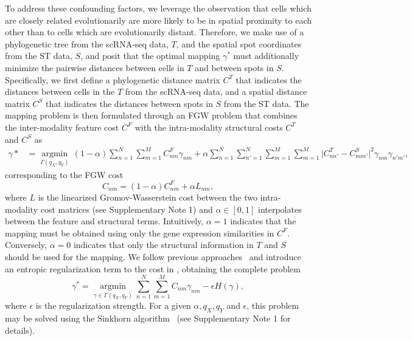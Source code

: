 \documentclass{article}
\begin{document}
To address these confounding factors, we leverage the observation that cells which are closely related evolutionarily are more likely to be in spatial proximity to each other than to cells which are evolutionarily distant. Therefore, we make use of a phylogenetic tree from the scRNA-seq data, $T$, and the spatial spot coordinates from the ST data, $S$, and posit that the optimal mapping $\gamma^*$ must additionally minimize the pairwise distances between cells in $T$ and between spots in $S$. Specifically, we first define a phylogenetic distance matrix $C^T$ that indicates the distances between cells in the $T$ from the scRNA-seq data, and a spatial distance matrix $C^S$ that indicates the distances between spots in $S$ from the ST data. The mapping problem is then formulated through an FGW problem that combines the inter-modality feature cost $C^F$ with the intra-modality structural costs $C^T$ and $C^S$ as
\begin{align}
\label{eq:fgw_ot}
    \gamma* &= \operatorname*{argmin}_{{ \Gamma(q_X, q_Y)}}\, (1-\alpha) 
    \sum_{n=1}^N \sum_{m=1}^M C^F_{nm}\gamma_{nm} 
    + \alpha \sum_{n=1}^N \sum_{n'=1}^N \sum_{m=1}^M \sum_{m=1}^M 
      \vert C^T_{nn'} - C^S_{mm'}\vert^2 \gamma_{nm}\gamma_{n'm'},
\end{align}
corresponding to the FGW cost
\begin{equation}
    \label{eq:fgw_cost}
    C_{nm} = (1-\alpha) C^F_{nm} +  \alpha L_{nm},
\end{equation}
where $L$ is the linearized Gromov-Wasserstein cost between the two intra-modality cost matrices (see Supplementary Note 1) and $\alpha\in[0,1]$ interpolates between the feature and structural terms. Intuitively, $\alpha=1$ indicates that the mapping must be obtained using only the gene expression similarities in $C^F$. Conversely, $\alpha=0$ indicates that only the structural information in $T$ and $S$ should be used for the mapping. We follow previous approaches~\cite{lange_mapping_2024} and introduce an entropic regularization term to the cost in , obtaining the complete problem
\begin{equation}
    \gamma^* =\operatorname*{argmin}_{\gamma\in \Gamma(q_X, q_Y)}\sum_{n=1}^N \sum_{m=1}^M C_{nm}\gamma_{nm} - \epsilon H(\gamma),
\end{equation}
where $\epsilon$ is the regularization strength. For a given $\alpha, q_X, q_Y$ and $\epsilon$, this problem may be solved using the Sinkhorn algorithm~\cite{cuturi_sinkhorn_2013} (see Supplementary Note 1 for details).
\end{document}
